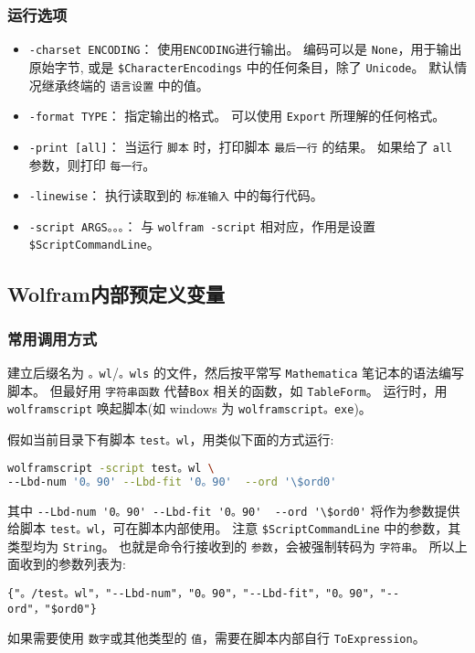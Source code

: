 \subsubsection{运行选项}
\begin{itemize}
\item \verb`-charset ENCODING`： 使用\verb`ENCODING`进行输出。 编码可以是 \verb`None`，用于输出原始字节,
或是 \verb`$CharacterEncodings` 中的任何条目，除了 \verb`Unicode`。 默认情况继承终端的 \verb`语言设置` 中的值。
\item \verb`-format TYPE`： 指定输出的格式。 可以使用 \verb`Export` 所理解的任何格式。
\item \verb`-print [all]`： 当运行 \verb`脚本` 时，打印脚本 \verb`最后一行` 的结果。 如果给了 \verb`all` 参数，则打印 \verb`每一行`。
\item \verb`-linewise`： 执行读取到的 \verb`标准输入` 中的每行代码。
\item \verb`-script ARGS。。。`： 与 \verb`wolfram -script` 相对应，作用是设置 \verb`$ScriptCommandLine`。
\end{itemize}

\subsection{Wolfram内部预定义变量}

\subsubsection{常用调用方式}

建立后缀名为 \verb`。wl`/\verb`。wls` 的文件，然后按平常写 \verb`Mathematica` 笔记本的语法编写脚本。
但最好用 \verb`字符串函数` 代替\verb`Box` 相关的函数，如 \verb`TableForm`。
运行时，用 \verb`wolframscript` 唤起脚本(如 windows 为 \verb`wolframscript。exe`)。

假如当前目录下有脚本 \verb`test。wl`，用类似下面的方式运行:
\begin{lstlisting}[language=bash]
wolframscript -script test。wl \
--Lbd-num '0。90' --Lbd-fit '0。90'  --ord '\$ord0'
\end{lstlisting}

其中 \verb`--Lbd-num '0。90' --Lbd-fit '0。90'  --ord '\$ord0'` 将作为参数提供给脚本 \verb`test。wl`，可在脚本内部使用。
注意 \verb`$ScriptCommandLine` 中的参数，其类型均为 \verb`String`。
也就是命令行接收到的 \verb`参数`，会被强制转码为 \verb`字符串`。
所以上面收到的参数列表为:
\begin{lstlisting}[language=mma]
{"。/test。wl"，"--Lbd-num"，"0。90"，"--Lbd-fit"，"0。90"，"--ord"，"$ord0"}
\end{lstlisting}
如果需要使用 \verb`数字`或其他类型的 \verb`值`，需要在脚本内部自行 \verb`ToExpression`。

